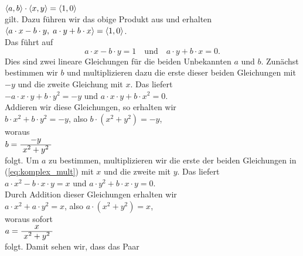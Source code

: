 \\[0.2cm]
\hspace*{1.3cm} $\pair(a,b) \cdot \pair(x,y) = \pair(1,0)$
\\[0.2cm]
gilt.  Dazu f\"{u}hren wir das obige Produkt aus und erhalten
\\[0.2cm]
\hspace*{1.3cm} $\pair(a \cdot x - b \cdot y,\; a \cdot y + b \cdot x) = \pair(1,0)$.
\\[0.2cm]
Das f\"{u}hrt auf 
\begin{equation}
  \label{eq:komplex_mult}  
 a \cdot x - b \cdot y = 1 \quad \mbox{und} \quad a \cdot y + b \cdot x = 0.
\end{equation}
Dies sind zwei lineare Gleichungen f\"{u}r die beiden Unbekannten $a$ und $b$.  Zun\"{a}chst bestimmen wir
$b$ und multiplizieren dazu die erste dieser beiden Gleichungen mit $-y$ und die zweite Gleichung mit $x$.  Das
liefert
\\[0.2cm]
\hspace*{1.3cm} 
$-a \cdot x \cdot y + b \cdot y^2 = -y$ \quad und \quad $a \cdot x \cdot y + b \cdot
x^2 = 0$.
\\[0.2cm]
Addieren wir diese Gleichungen, so erhalten wir
\\[0.2cm]
\hspace*{1.3cm} 
$b \cdot x^2 + b \cdot y^2 = -y$, \quad also \quad
$b \cdot (x^2 + y^2) = -y$,
\\[0.2cm]
woraus
\\[0.2cm]
\hspace*{1.3cm} $b = \bruch{-y}{x^2 + y^2}$
\\[0.2cm]
folgt.  Um $a$ zu bestimmen, multiplizieren wir die erste der beiden Gleichungen in
(\ref{eq:komplex_mult}) mit $x$ und die zweite mit $y$.  Das liefert
\\[0.2cm]
\hspace*{1.3cm}
$a \cdot x^2 - b \cdot x \cdot y = x$ \quad und \quad $a \cdot y^2 + b \cdot x \cdot y = 0$.
\\[0.2cm]
Durch Addition dieser Gleichungen erhalten wir
\\[0.2cm]
\hspace*{1.3cm}
$a \cdot x^2 + a \cdot y^2 = x$, \quad also \quad $a \cdot (x^2 + y^2) = x$,
\\[0.2cm]
woraus sofort
\\[0.2cm]
\hspace*{1.3cm}
$a = \bruch{x}{x^2 + y^2}$
\\[0.2cm]
folgt.  Damit sehen wir, dass das Paar
\\[0.2cm]
